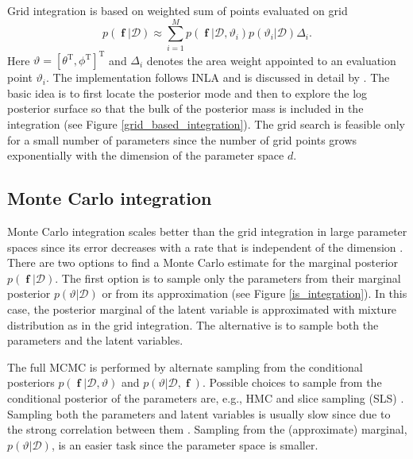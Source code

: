 \documentclass[twoside,11pt]{article}
\DeclareMathOperator{\f}{\mathbf{f}}
\begin{document}
Grid integration is based on weighted sum of points evaluated on
grid
%
\begin{equation}\label{eq_grid_integration}
p(\f|\mathcal{D}) \approx \sum_{i=1}^M p(\f|\mathcal{D}, \vartheta_i)
p(\vartheta_i|\mathcal{D}) \Delta_i.
\end{equation}
%
Here $\vartheta = [\theta^{\text{T}}, \phi^{\text{T}}]^{\text{T}}$ and
$\Delta_i$ denotes the area weight appointed to an evaluation point
$\vartheta_i$. The implementation follows INLA
\citep{Rue+Martino+Chopin:2009} and is discussed in detail by
\citet{Vanhatalo+Pietilainen+Vehtari:2010}. The basic idea is to first
locate the posterior mode and then to explore the log posterior
surface so that the bulk of the posterior mass is included in the
integration (see Figure \ref{grid_based_integration}).
The grid search is feasible only for a small number of parameters
since the number of grid points grows exponentially with the dimension
of the parameter space $d$. 

\subsection{Monte Carlo integration}

Monte Carlo integration scales better than the grid integration in
large parameter spaces since its error decreases with a rate that is
independent of the dimension \citep{Robert+Casella:2004}.  There are
two options to find a Monte Carlo estimate for the marginal posterior
$p(\f|\mathcal{D})$. The first option is to sample only the parameters
from their marginal posterior $p(\vartheta|\mathcal{D})$ or from its
approximation (see Figure \ref{is_integration}). In this case, the
posterior marginal of the latent variable is approximated with mixture
distribution as in the grid integration. The alternative is to sample
both the parameters and the latent variables.

The full MCMC is performed by alternate sampling from the conditional
posteriors $p(\f|\mathcal{D},\vartheta)$ and
$p(\vartheta|\mathcal{D},\f)$. Possible choices to sample from the
conditional posterior of the parameters are, e.g., HMC and slice
sampling (SLS) \citep{Neal:2003}. Sampling both the parameters and
latent variables is usually slow since due to the strong correlation
between them
\citep{Vanhatalo+Vehtari:2007,Vanhatalo+Pietilainen+Vehtari:2010}.
Sampling from the (approximate) marginal, $p(\vartheta|\mathcal{D})$,
is an easier task since the parameter space is smaller.
\end{document}
